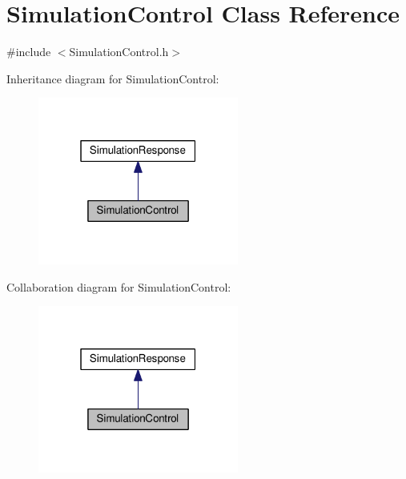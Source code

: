 \hypertarget{class_simulation_control}{}\section{Simulation\+Control Class Reference}
\label{class_simulation_control}


{\ttfamily \#include $<$Simulation\+Control.\+h$>$}



Inheritance diagram for Simulation\+Control\+:
\nopagebreak
\begin{figure}[H]
\begin{center}
\leavevmode
\includegraphics[width=187pt]{class_simulation_control__inherit__graph}
\end{center}
\end{figure}


Collaboration diagram for Simulation\+Control\+:
\nopagebreak
\begin{figure}[H]
\begin{center}
\leavevmode
\includegraphics[width=187pt]{class_simulation_control__coll__graph}
\end{center}
\end{figure}
